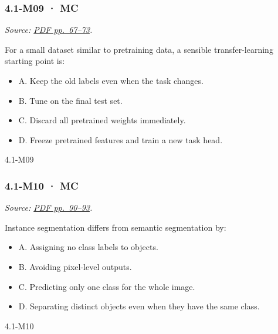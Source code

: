 \noindent\begin{minipage}{\linewidth}

\subsubsection{4.1-M09 · MC}\label{m09-mc-11}

\emph{Source: \href{../Lecture\%20Slides/4.1.\%20CNNs.pdf\#page=67}{PDF
pp.~67--73}.}

For a small dataset similar to pretraining data, a sensible
transfer-learning starting point is:

\begin{itemize}
\tightlist
\item
  A. Keep the old labels even when the task changes.
\item
  B. Tune on the final test set.
\item
  C. Discard all pretrained weights immediately.
\item
  D. Freeze pretrained features and train a new task head.
\end{itemize}

\begin{solution}[8mm]{4.1-M09}

\end{solution}
\end{minipage}\par\medskip

\noindent\begin{minipage}{\linewidth}

\subsubsection{4.1-M10 · MC}\label{m10-mc-11}

\emph{Source: \href{../Lecture\%20Slides/4.1.\%20CNNs.pdf\#page=90}{PDF
pp.~90--93}.}

Instance segmentation differs from semantic segmentation by:

\begin{itemize}
\tightlist
\item
  A. Assigning no class labels to objects.
\item
  B. Avoiding pixel-level outputs.
\item
  C. Predicting only one class for the whole image.
\item
  D. Separating distinct objects even when they have the same class.
\end{itemize}

\begin{solution}[8mm]{4.1-M10}

\end{solution}
\end{minipage}\par\medskip

